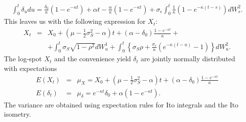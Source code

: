 \documentclass[a4paper,11pt]{article}
\newcommand{\sigmaS}{\sigma_S}
\newcommand{\sigmaE}{\sigma_\epsilon}
\begin{document}
\begin{appendix}
\begin{equation}
\begin{split}
  \int_0^t \delta_u du =  \frac{\delta_0}{\kappa} \left(1 -
    e^{-\kappa t}\right) + \alpha t - \frac{\alpha}{\kappa} \left(1 - e^{-\kappa
      t}\right) + \sigmaE \int_0^t \frac{1}{\kappa}\left(1 -
    e^{-\kappa (t - s)}\right) dW_s^2.
\end{split}
\end{equation}
This leaves us with the following expression for $X_t$:
\begin{eqnarray}
  \label{eq:x}
  X_t &=& X_0 + \left(\mu - \frac{1}{2}\sigmaS^2 - \alpha\right) t +
  (\alpha - \delta_0) \frac{1 - e^{-\kappa t}}{\kappa} +  \nonumber \\
  && +  \int_0^t \sigmaS \sqrt{1 - \rho^2} dW_u^1
  + \int_0^t \left\{\sigmaS \rho + \frac{\sigmaE}{\kappa}\left(e^{-\kappa (t - u)} - 1\right)\right\} dW_u^2.
\end{eqnarray}
The log-spot $X_t$ and the convenience yield $\delta_t$ are jointly
normally distributed with expectations
\begin{eqnarray}
  \label{eq:5}
  E(X_t) &=& \mu_X = X_0 + \left(\mu - \frac{1}{2}\sigmaS^2 - \alpha\right) t
  + \left(\alpha  - \delta_0\right) \frac{1 - e^{-\kappa t}}{\kappa}\\
  E(\delta_t) &=& \mu_\delta = e^{-\kappa t}\delta_0 + \alpha \left(1 - e^{-\kappa
      t}\right).
\end{eqnarray}
The variance are obtained using expectation rules for Ito integrals
and the Ito isometry.


\end{appendix}
\end{document}
